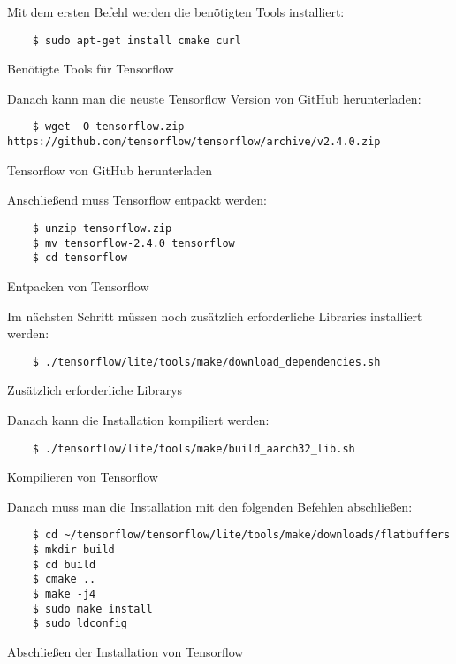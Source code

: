 Mit dem ersten Befehl werden die benötigten Tools installiert:

\begin{listing}[H]
    \begin{verbatim}
    $ sudo apt-get install cmake curl
    \end{verbatim}
    \caption{Benötigte Tools für Tensorflow}
\end{listing}

Danach kann man die neuste Tensorflow Version von GitHub herunterladen:

\begin{listing}[H]
    \begin{verbatim}
    $ wget -O tensorflow.zip https://github.com/tensorflow/tensorflow/archive/v2.4.0.zip
    \end{verbatim}
    \caption{Tensorflow von GitHub herunterladen}
\end{listing}

Anschließend muss Tensorflow entpackt werden:

\begin{listing}[H]
    \begin{verbatim}
    $ unzip tensorflow.zip
    $ mv tensorflow-2.4.0 tensorflow
    $ cd tensorflow
    \end{verbatim}
    \caption{Entpacken von Tensorflow}
\end{listing}

Im nächsten Schritt müssen noch zusätzlich erforderliche Libraries installiert werden:

\begin{listing}[H]
    \begin{verbatim}
    $ ./tensorflow/lite/tools/make/download_dependencies.sh
    \end{verbatim}
    \caption{Zusätzlich erforderliche Librarys}
\end{listing}

Danach kann die Installation kompiliert werden:

\begin{listing}[H]
    \begin{verbatim}
    $ ./tensorflow/lite/tools/make/build_aarch32_lib.sh
    \end{verbatim}
    \caption{Kompilieren von Tensorflow}
\end{listing}

Danach muss man die Installation mit den folgenden Befehlen abschließen:

\begin{listing}[H]
    \begin{verbatim}
    $ cd ~/tensorflow/tensorflow/lite/tools/make/downloads/flatbuffers
    $ mkdir build
    $ cd build
    $ cmake ..
    $ make -j4
    $ sudo make install
    $ sudo ldconfig
    \end{verbatim}
    \caption{Abschließen der Installation von Tensorflow}
\end{listing}

